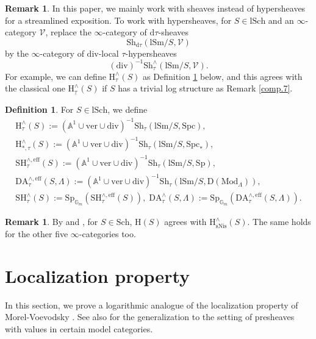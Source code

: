 \documentclass[10pt]{amsart}
\theoremstyle{definition}
\newtheorem{df}[thm]{Definition}
\newtheorem{rmk}[thm]{Remark}
\theoremstyle{remark}
\numberwithin{equation}{subsection}
\newcommand{\A}{\mathbb{A}}
\newcommand{\G}{\mathbb{G}}
\newcommand{\cV}{\mathcal{V}}
\newcommand{\rH}{\mathrm{H}}
\newcommand{\ul}{\underline}
\newcommand{\eff}{{\mathrm{eff}}}
\newcommand{\Spt}{\mathrm{Sp}}
\newcommand{\SH}{\mathrm{SH}}
\newcommand{\DLambda}{\mathrm{D}(\mathrm{Mod}_{\Lambda})}
\newcommand{\DA}{\mathrm{DA}}
\newcommand{\Sch}{\mathrm{Sch}}
\newcommand{\lSch}{\mathrm{lSch}}
\newcommand{\lSm}{\mathrm{lSm}}
\newcommand{\infShv}{\mathrm{Sh}}
\newcommand{\Spc}{\mathrm{Spc}}
\newcommand{\Stab}{\mathrm{Sp}}
\newcommand{\ver}{\mathrm{ver}}
\newcommand{\divi}{\mathrm{div}}
\newcommand{\dtau}{\mathrm{d}\tau}
\newcommand{\sNis}{\mathrm{sNis}}
\begin{document}
\begin{rmk}
\label{comp.9}
In this paper,
we mainly work with sheaves instead of hypersheaves for a streamlined exposition.
To work with hypersheaves,
for $S\in \lSch$ and an $\infty$-category $\cV$,
replace the $\infty$-category of $\dtau$-sheaves
\[
\infShv_{\dtau}(\lSm/S,\cV)
\]
by the $\infty$-category of $\divi$-local $\tau$-hypersheaves
\[
(\divi)^{-1}\infShv_\tau^\wedge(\lSm/S,\cV).
\]
For example,
we can define $\rH_{\tau}^\wedge(S)$ as Definition \ref{comp.10} below,
and this agrees with the classical one $\rH_{\ul{\tau}}^\wedge(S)$ if $S$ has a trivial log structure as Remark \ref{comp.7}.
\end{rmk}

\begin{df}
\label{comp.10}
For $S\in \lSch$, we define
\begin{gather*}
\rH_{\tau}^\wedge(S)
:=
(\A^1\cup \ver\cup \divi)^{-1}\infShv_{\tau}(\lSm/S,\Spc),
\\
\rH_{*,\tau}^\wedge(S)
:=
(\A^1\cup \ver\cup \divi)^{-1}\infShv_{\tau}(\lSm/S,\Spc_*),
\\
\SH_{\tau}^{\wedge,\eff}(S)
:=
(\A^1\cup \ver\cup \divi)^{-1}\infShv_{\tau}(\lSm/S,\Spt),
\\
\DA_{\tau}^{\wedge,\eff}(S,\Lambda)
:=
(\A^1\cup \ver\cup \divi)^{-1}\infShv_{\tau}(\lSm/S,\DLambda),
\\
\SH_{\tau}^\wedge(S)
:=
\Stab_{\G_m}(\SH_{\tau}^{\wedge,\eff}(S)),
\;
\DA_{\tau}^\wedge(S,\Lambda)
:=
\Stab_{\G_m}(\DA_{\tau}^{\wedge,\eff}(S,\Lambda)).
\end{gather*}
\end{df}

\begin{rmk}
By \cite[Proposition 3.3.28]{logDM} and \cite[Remark 2.6.3]{logSH},
for $S\in \Sch$,
$\rH(S)$ agrees with $\rH_\sNis^\wedge(S)$.
The same holds for the other five $\infty$-categories too.
\end{rmk}

\section{Localization property}



In this section, we prove a logarithmic analogue of the localization property of Morel-Voevodsky \cite[Theorem 2.21, p.\ 114]{MV}.
See also \cite[Th\'er\`eme 4.5.36]{Ayo072} for the generalization to the setting of presheaves with values in certain model categories.
\end{document}
